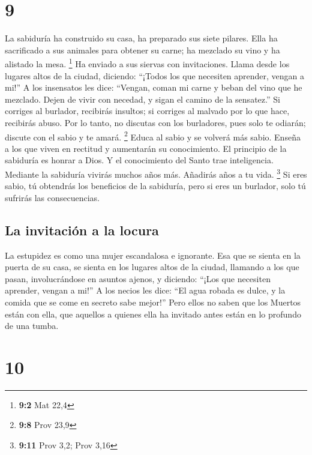 \hypertarget{section-8}{%
\section{9}\label{section-8}}

 La sabiduría ha construido su casa, ha preparado sus siete
pilares.  Ella ha sacrificado a sus animales para obtener su
carne; ha mezclado su vino y ha alistado la mesa. \footnote{\textbf{9:2}
  Mat 22,4}  Ha enviado a sus siervas con invitaciones.
Llama desde los lugares altos de la ciudad, diciendo: 
``¡Todos los que necesiten aprender, vengan a mi!'' A los insensatos les
dice:  ``Vengan, coman mi carne y beban del vino que he
mezclado.  Dejen de vivir con necedad, y sigan el camino de
la sensatez.''  Si corriges al burlador, recibirás insultos;
si corriges al malvado por lo que hace, recibirás abuso. 
Por lo tanto, no discutas con los burladores, pues solo te odiarán;
discute con el sabio y te amará. \footnote{\textbf{9:8} Prov 23,9}
 Educa al sabio y se volverá más sabio. Enseña a los que
viven en rectitud y aumentarán su conocimiento.  El
principio de la sabiduría es honrar a Dios. Y el conocimiento del Santo
trae inteligencia.  Mediante la sabiduría vivirás muchos
años más. Añadirás años a tu vida. \footnote{\textbf{9:11} Prov 3,2;
  Prov 3,16}  Si eres sabio, tú obtendrás los beneficios de
la sabiduría, pero si eres un burlador, solo tú sufrirás las
consecuencias.

\hypertarget{la-invitaciuxf3n-a-la-locura}{%
\subsection{La invitación a la
locura}\label{la-invitaciuxf3n-a-la-locura}}

 La estupidez es como una mujer escandalosa e ignorante.
 Esa que se sienta en la puerta de su casa, se sienta en
los lugares altos de la ciudad,  llamando a los que pasan,
involucrándose en asuntos ajenos, y diciendo:  ``¡Los que
necesiten aprender, vengan a mi!'' A los necios les dice: 
``El agua robada es dulce, y la comida que se come en secreto sabe
mejor!''  Pero ellos no saben que los Muertos están con
ella, que aquellos a quienes ella ha invitado antes están en lo profundo
de una tumba.

\hypertarget{section-9}{%
\section{10}\label{section-9}}

